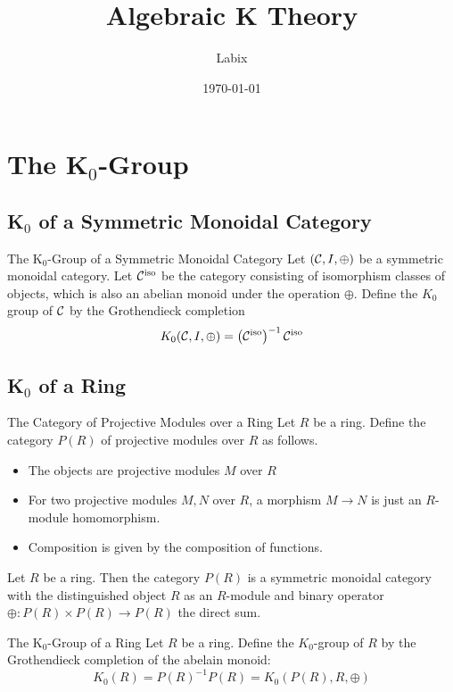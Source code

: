 \documentclass[a4paper]{article}
\title{Algebraic K Theory}
\author{Labix}
\date{\today}
\begin{document}
\maketitle
\begin{abstract}
\end{abstract}
\pagebreak
\tableofcontents

\pagebreak
\section{The K${_0}$-Group}
\subsection{K${_0}$ of a Symmetric Monoidal Category}
\begin{defn}{The K${_0}$-Group of a Symmetric Monoidal Category}{} Let $(\mathcal{C},I,\oplus)$ be a symmetric monoidal category. Let $\mathcal{C}^\text{iso}$ be the category consisting of isomorphism classes of objects, which is also an abelian monoid under the operation $\oplus$. Define the $K_0$ group of $\mathcal{C}$ by the Grothendieck completion $$K_0(\mathcal{C},I,\oplus)=\left(\mathcal{C}^\text{iso}\right)^{-1}\mathcal{C}^\text{iso}$$
\end{defn}

\subsection{K${_0}$ of a Ring}
\begin{defn}{The Category of Projective Modules over a Ring}{} Let $R$ be a ring. Define the category $P(R)$ of projective modules over $R$ as follows. 
\begin{itemize}
\item The objects are projective modules $M$ over $R$
\item For two projective modules $M,N$ over $R$, a morphism $M\to N$ is just an $R$-module homomorphism. 
\item Composition is given by the composition of functions. 
\end{itemize}
\end{defn}

\begin{lmm}{}{} Let $R$ be a ring. Then the category $P(R)$ is a symmetric monoidal category with the distinguished object $R$ as an $R$-module and binary operator $\oplus:P(R)\times P(R)\to P(R)$ the direct sum. 
\end{lmm}

\begin{defn}{The K${_0}$-Group of a Ring}{} Let $R$ be a ring. Define the $K_0$-group of $R$ by the Grothendieck completion of the abelain monoid: $$K_0(R)=P(R)^{-1}P(R)=K_0(P(R),R,\oplus)$$
\end{defn}
\end{document}
